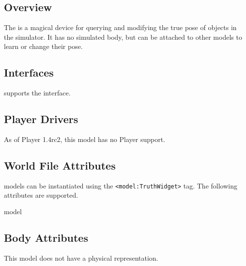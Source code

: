 
\subsection{Overview}

The {\tt \modelName} is a magical device for querying and modifying
the true pose of objects in the simulator.  It has no simulated body,
but can be attached to other models to learn or change their pose.


\subsection{\libgazebo Interfaces}

{\tt \modelName} supports the  interface.


\subsection{Player Drivers}

As of Player 1.4rc2, this model has no Player support.


\subsection{World File Attributes}

{\tt \modelName} models can be instantiated using the
\verb+<model:TruthWidget>+ tag.  The following attributes are
supported.

\begin{xmlattrtable}{model}{\modelName}
\modeldefaults
\end{xmlattrtable}


\subsection{Body Attributes}

This model does not have a physical representation.



